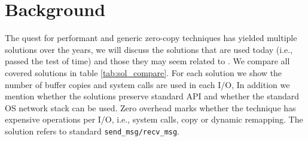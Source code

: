 
\section{Background}\label{sec:background}
The quest for performant and generic zero-copy techniques has yielded multiple solutions over the years, we will discuss the solutions that are used today (i.e., passed the test of time) and those they may seem related to \oursys. We compare all covered solutions in table \ref{tab:sol_compare}. For each solution we show the number of buffer copies and system calls are used in each I/O, In addition we mention whether the solutions preserve standard \sockets API and whether the standard OS network stack can be used. Zero overhead marks whether the technique has expensive operations per I/O, i.e., system calls, copy or dynamic remapping. The  solution refers to standard \texttt{send\_msg/recv\_msg}.


